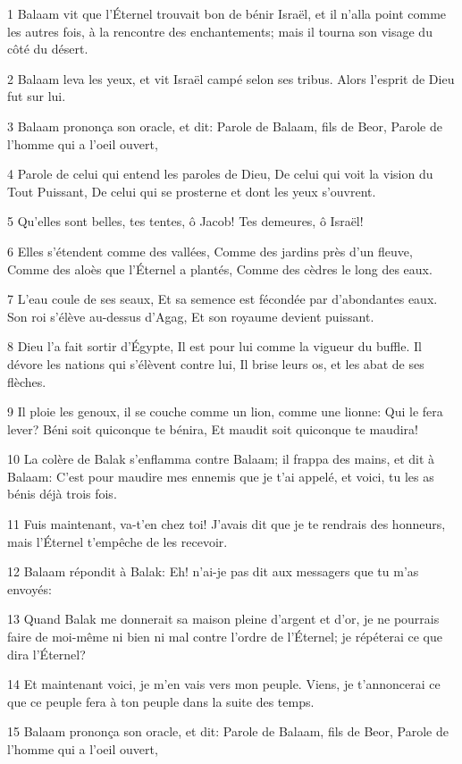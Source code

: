 \par 1 Balaam vit que l'Éternel trouvait bon de bénir Israël, et il n'alla point comme les autres fois, à la rencontre des enchantements; mais il tourna son visage du côté du désert.
\par 2 Balaam leva les yeux, et vit Israël campé selon ses tribus. Alors l'esprit de Dieu fut sur lui.
\par 3 Balaam prononça son oracle, et dit: Parole de Balaam, fils de Beor, Parole de l'homme qui a l'oeil ouvert,
\par 4 Parole de celui qui entend les paroles de Dieu, De celui qui voit la vision du Tout Puissant, De celui qui se prosterne et dont les yeux s'ouvrent.
\par 5 Qu'elles sont belles, tes tentes, ô Jacob! Tes demeures, ô Israël!
\par 6 Elles s'étendent comme des vallées, Comme des jardins près d'un fleuve, Comme des aloès que l'Éternel a plantés, Comme des cèdres le long des eaux.
\par 7 L'eau coule de ses seaux, Et sa semence est fécondée par d'abondantes eaux. Son roi s'élève au-dessus d'Agag, Et son royaume devient puissant.
\par 8 Dieu l'a fait sortir d'Égypte, Il est pour lui comme la vigueur du buffle. Il dévore les nations qui s'élèvent contre lui, Il brise leurs os, et les abat de ses flèches.
\par 9 Il ploie les genoux, il se couche comme un lion, comme une lionne: Qui le fera lever? Béni soit quiconque te bénira, Et maudit soit quiconque te maudira!
\par 10 La colère de Balak s'enflamma contre Balaam; il frappa des mains, et dit à Balaam: C'est pour maudire mes ennemis que je t'ai appelé, et voici, tu les as bénis déjà trois fois.
\par 11 Fuis maintenant, va-t'en chez toi! J'avais dit que je te rendrais des honneurs, mais l'Éternel t'empêche de les recevoir.
\par 12 Balaam répondit à Balak: Eh! n'ai-je pas dit aux messagers que tu m'as envoyés:
\par 13 Quand Balak me donnerait sa maison pleine d'argent et d'or, je ne pourrais faire de moi-même ni bien ni mal contre l'ordre de l'Éternel; je répéterai ce que dira l'Éternel?
\par 14 Et maintenant voici, je m'en vais vers mon peuple. Viens, je t'annoncerai ce que ce peuple fera à ton peuple dans la suite des temps.
\par 15 Balaam prononça son oracle, et dit: Parole de Balaam, fils de Beor, Parole de l'homme qui a l'oeil ouvert,
